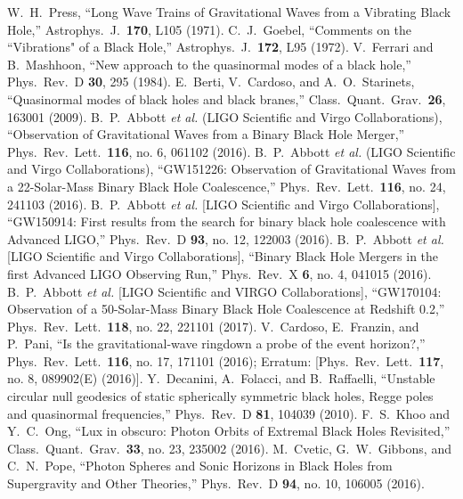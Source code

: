 \documentclass[twocolumn,showpacs,preprintnumbers,amsmath,amssymb,floatfix,nofootinbib]{revtex4-1}
\begin{document}
\begin{thebibliography}{99}
 W.~H.~Press, ``Long Wave Trains of Gravitational Waves from a Vibrating Black Hole,'' Astrophys.\ J.\  {\bf 170}, L105 (1971).
 C.~J.~Goebel, ``Comments on the ``Vibrations" of a Black Hole,'' Astrophys.\ J.\  {\bf 172}, L95 (1972).
 V.~Ferrari and B.~Mashhoon, ``New approach to the quasinormal modes of a black hole,'' Phys.\ Rev.\ D {\bf 30}, 295 (1984).
 E.~Berti, V.~Cardoso, and A.~O.~Starinets, ``Quasinormal modes of black holes and black branes,'' Class.\ Quant.\ Grav.\  {\bf 26}, 163001 (2009).
 B.~P.~Abbott {\it et al.} (LIGO Scientific and Virgo Collaborations), ``Observation of Gravitational Waves from a Binary Black Hole Merger,'' Phys.\ Rev.\ Lett.\  {\bf 116}, no. 6, 061102 (2016).
 B.~P.~Abbott {\it et al.} (LIGO Scientific and Virgo Collaborations), ``GW151226: Observation of Gravitational Waves from a 22-Solar-Mass Binary Black Hole Coalescence,'' Phys.\ Rev.\ Lett.\  {\bf 116}, no. 24, 241103 (2016).
 B.~P.~Abbott {\it et al.} [LIGO Scientific and Virgo Collaborations], ``GW150914: First results from the search for binary black hole coalescence with Advanced LIGO,'' Phys.\ Rev.\ D {\bf 93}, no. 12, 122003 (2016).
 B.~P.~Abbott {\it et al.} [LIGO Scientific and Virgo Collaborations], ``Binary Black Hole Mergers in the first Advanced LIGO Observing Run,'' Phys.\ Rev.\ X {\bf 6}, no. 4, 041015 (2016).
 B.~P.~Abbott {\it et al.} [LIGO Scientific and VIRGO Collaborations], ``GW170104: Observation of a 50-Solar-Mass Binary Black Hole Coalescence at Redshift 0.2,'' Phys.\ Rev.\ Lett.\  {\bf 118}, no. 22, 221101 (2017).
 V.~Cardoso, E.~Franzin, and P.~Pani, ``Is the gravitational-wave ringdown a probe of the event horizon?,'' Phys.\ Rev.\ Lett.\  {\bf 116}, no. 17, 171101 (2016); Erratum: [Phys.\ Rev.\ Lett.\  {\bf 117}, no. 8, 089902(E) (2016)].
 Y.~Decanini, A.~Folacci, and B.~Raffaelli, ``Unstable circular null geodesics of static spherically symmetric black holes, Regge poles and quasinormal frequencies,'' Phys.\ Rev.\ D {\bf 81}, 104039 (2010).
 F.~S.~Khoo and Y.~C.~Ong, ``Lux in obscuro: Photon Orbits of Extremal Black Holes Revisited,'' Class.\ Quant.\ Grav.\  {\bf 33}, no. 23, 235002 (2016).
 M.~Cvetic, G.~W.~Gibbons, and C.~N.~Pope, ``Photon Spheres and Sonic Horizons in Black Holes from Supergravity and Other Theories,'' Phys.\ Rev.\ D {\bf 94}, no. 10, 106005 (2016).

\end{thebibliography}
\end{document}

